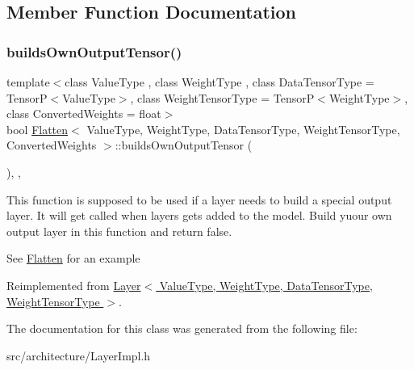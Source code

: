 \subsection{Member Function Documentation}
\mbox{\label{classFlatten_a53379945e182152effef9456b32eb65a}} 
\subsubsection{\texorpdfstring{builds\+Own\+Output\+Tensor()}{buildsOwnOutputTensor()}}
{\footnotesize\ttfamily template$<$class Value\+Type , class Weight\+Type , class Data\+Tensor\+Type  = Tensor\+P$<$\+Value\+Type$>$, class Weight\+Tensor\+Type  = Tensor\+P$<$\+Weight\+Type$>$, class Converted\+Weights  = float$>$ \\
bool \hyperlink{classFlatten}{Flatten}$<$ Value\+Type, Weight\+Type, Data\+Tensor\+Type, Weight\+Tensor\+Type, Converted\+Weights $>$\+::builds\+Own\+Output\+Tensor (\begin{DoxyParamCaption}{ }\end{DoxyParamCaption})\hspace{0.3cm}{\ttfamily [inline]}, {\ttfamily [override]}, {\ttfamily [virtual]}}



This function is supposed to be used if a layer needs to build a special output layer. It will get called when layers gets added to the model. Build yuour own output layer in this function and return false. 

See \hyperlink{classFlatten}{Flatten} for an example 

Reimplemented from \hyperlink{classLayer_a9a126cb372c0bd529c65a06077d8b429}{Layer$<$ Value\+Type, Weight\+Type, Data\+Tensor\+Type, Weight\+Tensor\+Type $>$}.



The documentation for this class was generated from the following file\+:\begin{DoxyCompactItemize}
\item 
src/architecture/Layer\+Impl.\+h\end{DoxyCompactItemize}
